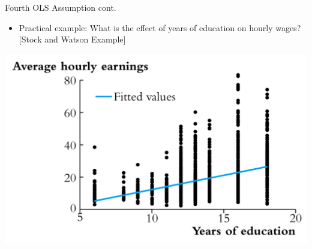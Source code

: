 \documentclass[8pt,ignorenonframetext,dvipsnames]{beamer}
\providecommand{\tightlist}{%
  \setlength{\itemsep}{0pt}\setlength{\parskip}{0pt}}
\let\olditem\item
\renewcommand{\item}{%
  \olditem\vspace{4pt}
}
\begin{document}
\begin{frame}{Fourth OLS Assumption cont.}
\protect\hypertarget{fourth-ols-assumption-cont.-2}{}

\begin{itemize}
\tightlist
\item
  Practical example: What is the effect of years of education on hourly
  wages? {[}Stock and Watson Example{]}
\end{itemize}

\includegraphics{heteroskedasticity_wages.png}

\end{frame}
\end{document}
